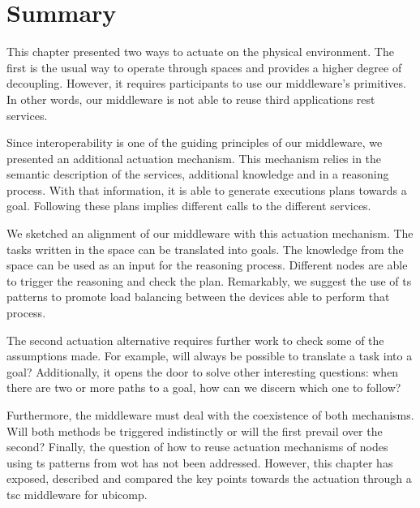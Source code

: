 \section{Summary}
\label{sec:actuation_summary}

This chapter presented two ways to actuate on the physical environment.
The first is the usual way to operate through spaces and provides a higher degree of decoupling.
However, it requires participants to use our middleware's primitives. %
In other words, our middleware is not able to reuse third applications \ac{rest} services.


Since interoperability is one of the guiding principles of our middleware, we presented an additional actuation mechanism.
This mechanism relies in the semantic description of the services, additional knowledge and in a reasoning process. %
With that information, it is able to generate executions plans towards a goal.
Following these plans implies different calls to the different services.

We sketched an alignment of our middleware with this actuation mechanism.
The tasks written in the space can be translated into goals.
The knowledge from the space can be used as an input for the reasoning process.
Different nodes are able to trigger the reasoning and check the plan.
Remarkably, we suggest the use of \ac{ts} patterns to promote load balancing between the devices able to perform that process.


The second actuation alternative requires further work to check some of the assumptions made.
For example, will always be possible to translate a task into a goal?
Additionally, it opens the door to solve other interesting questions: when there are two or more paths to a goal, how can we discern which one to follow?


Furthermore, the middleware must deal with the coexistence of both mechanisms.
Will both methods be triggered indistinctly or will the first prevail over the second?
Finally, the question of how to reuse actuation mechanisms of nodes using \ac{ts} patterns from \ac{wot} has not been addressed.
However, this chapter has exposed, described and compared the key points towards the actuation through a \ac{tsc} middleware for \ac{ubicomp}.